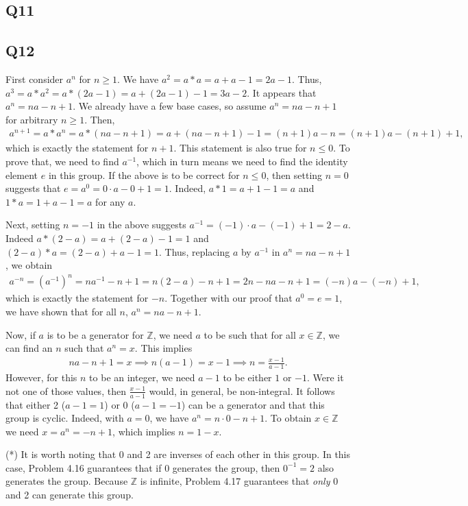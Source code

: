 \documentclass[12pt]{article}
\def\Z{{\mathbb Z}}        %
\numberwithin{theorem}{section}
\numberwithin{equation}{section}
\numberwithin{remark}{section}
\numberwithin{definition}{section}
\numberwithin{theorem}{section}
\numberwithin{lemma}{section}
\numberwithin{example}{section}
\begin{document}
\subsection{Q11}

\subsection{Q12}

First consider $a^n$ for $n\ge1$. We have $a^2=a*a=a+a-1=2a-1$. Thus, $a^3=a*a^2=a*(2a-1)=a+(2a-1)-1=3a-2$. It appears that $a^n=na-n+1$. We already have a few base cases, so assume $a^n=na-n+1$ for arbitrary $n\ge1$. Then, 
\begin{align*}
	a^{n+1}=a*a^n=a*(na-n+1)=a+(na-n+1)-1=(n+1)a-n=(n+1)a-(n+1)+1,
\end{align*}
which is exactly the statement for $n+1$. This statement is also true for $n\le0$. To prove that, we need to find $a^{-1}$, which in turn means we need to find the identity element $e$ in this group. If the above is to be correct for $n\le0$, then setting $n=0$ suggests that $e=a^0=0\cdot a-0+1=1$. Indeed, $a*1=a+1-1=a$ and $1*a=1+a-1=a$ for any $a$.

Next, setting $n=-1$ in the above suggests $a^{-1}=(-1)\cdot a -(-1)+1=2-a$. Indeed $a*(2-a)=a+(2-a)-1=1$ and $(2-a)*a=(2-a)+a-1=1$. Thus, replacing $a$ by $a^{-1}$ in $a^n=na-n+1$, we obtain
\begin{align*}
	a^{-n}=(a^{-1})^n=na^{-1}-n+1=n(2-a)-n+1=2n-na-n+1=(-n)a-(-n)+1,
\end{align*}
which is exactly the statement for $-n$. Together with our proof that $a^0=e=1$, we have shown that for all $n$, $a^n=na-n+1$. 

Now, if $a$ is to be a generator for $\Z$, we need $a$ to be such that for all $x\in\Z$, we can find an $n$ such that $a^n=x$. This implies
\begin{align*}
	na-n+1=x\implies n(a-1)=x-1 \implies n = \frac{x-1}{a-1}.
\end{align*}
However, for this $n$ to be an integer, we need $a-1$ to be either $1$ or $-1$. Were it not one of those values, then $ \frac{x-1}{a-1}$ would, in general, be non-integral. It follows that either 2 ($a-1=1$) or 0 ($a-1=-1$) can be a generator and that this group is cyclic. Indeed, with $a=0$, we have $a^n=n\cdot0-n+1$. To obtain $x\in\Z$ we need $x=a^n=-n+1$, which implies $n=1-x$.

\vspace{\baselineskip}

\noindent (*) It is worth noting that 0 and 2 are inverses of each other in this group. In this case, Problem 4.16 guarantees that if 0 generates the group, then $0^{-1}=2$ also generates the group. Because $\Z$ is infinite, Problem 4.17 guarantees that \emph{only} 0 and 2 can generate this group. 
\end{document}
